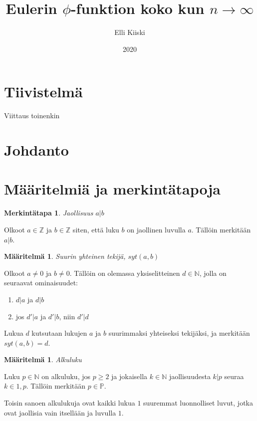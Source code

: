 \documentclass{article}
\title{Eulerin $\phi$-funktion koko kun $n \rightarrow \infty$}
\author{Elli Kiiski}
\date{2020}
\theoremstyle{definition}
\newtheorem{maaritelma}[subsection]{Määritelmä}
\newtheorem{merkinta}[subsection]{Merkintätapa}
\begin{document}
\maketitle

\newpage

\section{Tiivistelmä}

Viittaus \cite{HardyWright} toinenkin \cite{Saksman}

\section{Johdanto}

\section{Määritelmiä ja merkintätapoja}

\begin{merkinta}{\emph{Jaollisuus $a \vert b$}}

Olkoot $a \in \mathbb{Z}$ ja $b \in \mathbb{Z}$ siten, että luku $b$ on jaollinen luvulla $a$. Tällöin merkitään $a \vert b$.

\end{merkinta}

\begin{maaritelma}{\emph{Suurin yhteinen tekijä, $syt(a, b)$}}

Olkoot $a \not= 0$ ja $b \not= 0$. Tällöin on olemassa yksiselitteinen $d \in \mathbb{N}$, jolla on seuraavat ominaisuudet:

\begin{enumerate}
 \item $d \vert a$ ja $d \vert b$
 \item jos $d' \vert a$ ja $d' \vert b$, niin $d' \vert d$
\end{enumerate}

Lukua $d$ kutsutaan lukujen $a$ ja $b$ suurimmaksi yhteiseksi tekijäksi, ja merkitään $syt(a,b) = d$.

\end{maaritelma}

\begin{maaritelma}{\emph{Alkuluku}}

Luku $p\in\mathbb{N}$ on alkuluku, jos $p \geq 2$ ja jokaisella $k\in\mathbb{N}$ jaollisuudesta $k \vert p$ seuraa $k\in{1, p}$. Tällöin merkitään $p\in\mathbb{P}$.

Toisin sanoen alkulukuja ovat kaikki lukua $1$ suuremmat luonnolliset luvut, jotka ovat jaollisia vain itsellään ja luvulla $1$.

\end{maaritelma}
\end{document}

